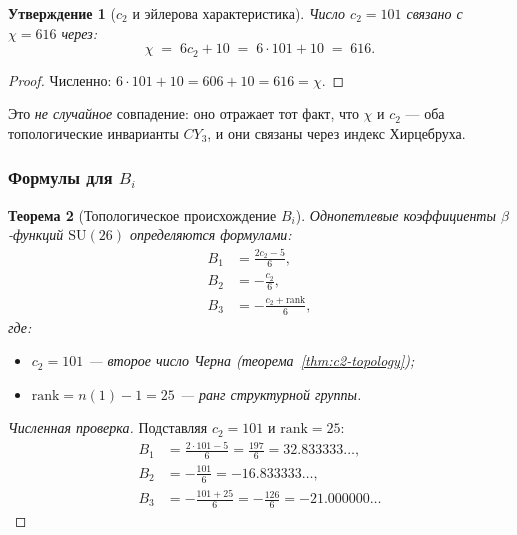 \documentclass[11pt,a4paper]{article}
\newcommand{\SU}{\ensuremath{\mathrm{SU}}}
\newcommand{\CY}{\ensuremath{CY_3}}
\newtheorem{theorem}{Теорема}[section]
\newtheorem{proposition}[theorem]{Утверждение}
\theoremstyle{definition}
\begin{document}
\begin{proposition}[$c_2$ и эйлерова характеристика]
\label{prop:c2-chi}
Число $c_2 = 101$ связано с $\chi = 616$ через:
\begin{equation}
    \chi \;=\; 6 c_2 + 10 \;=\; 6 \cdot 101 + 10 \;=\; 616.
    \label{eq:chi-c2}
\end{equation}
\end{proposition}

\begin{proof}
Численно: $6 \cdot 101 + 10 = 606 + 10 = 616 = \chi$. \checkmark
\end{proof}

\medskip\noindent
Это \emph{не случайное} совпадение: оно отражает тот факт,
что $\chi$ и $c_2$ --- оба топологические инварианты $\CY$,
и они связаны через индекс Хирцебруха.

\subsubsection{Формулы для \texorpdfstring{$B_i$}{B\_i}}

\begin{theorem}[Топологическое происхождение $B_i$]
\label{thm:bi-topology-main}
Однопетлевые коэффициенты $\beta$-функций $\SU(26)$
определяются формулами:
\begin{equation}
    \boxed{
    \begin{aligned}
    B_1 &= \frac{2 c_2 - 5}{6}, \\[0.3em]
    B_2 &= -\frac{c_2}{6}, \\[0.3em]
    B_3 &= -\frac{c_2 + \text{rank}}{6},
    \end{aligned}}
    \label{eq:bi-topology-main}
\end{equation}
где:
\begin{itemize}
    \item $c_2 = 101$ --- второе число Черна (теорема~\ref{thm:c2-topology});
    \item $\text{rank} = n(1) - 1 = 25$ --- ранг структурной группы.
\end{itemize}
\end{theorem}

\begin{proof}[Численная проверка]
Подставляя $c_2 = 101$ и $\text{rank} = 25$:
\begin{align}
    B_1 &= \frac{2 \cdot 101 - 5}{6} = \frac{197}{6}
    = 32.833333\ldots, \\
    B_2 &= -\frac{101}{6} = -16.833333\ldots, \\
    B_3 &= -\frac{101 + 25}{6} = -\frac{126}{6}
    = -21.000000\ldots
\end{align}
\end{proof}
\end{document}
